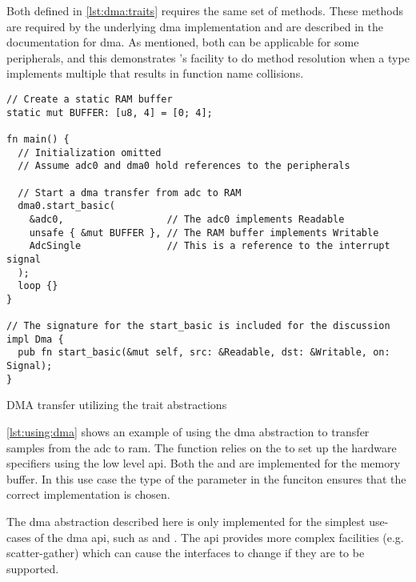 Both  defined in \autoref{lst:dma:traits} requires the same set of methods.
These methods are required by the underlying \gls{dma} implementation and are described in the {\emlib} documentation for \gls{dma}.
As mentioned, both  can be applicable for some peripherals, and this demonstrates {\rust}'s facility to do method resolution when a type implements multiple  that results in function name collisions.

\begin{listing}[H]
  \begin{verbatim}
// Create a static RAM buffer
static mut BUFFER: [u8, 4] = [0; 4];

fn main() {
  // Initialization omitted
  // Assume adc0 and dma0 hold references to the peripherals

  // Start a dma transfer from adc to RAM
  dma0.start_basic(
    &adc0,                  // The adc0 implements Readable
    unsafe { &mut BUFFER }, // The RAM buffer implements Writable
    AdcSingle               // This is a reference to the interrupt signal
  );
  loop {}
}

// The signature for the start_basic is included for the discussion
impl Dma {
  pub fn start_basic(&mut self, src: &Readable, dst: &Writable, on: Signal);
}
  \end{verbatim}
  \caption{DMA transfer utilizing the trait abstractions}
  \label{lst:using:dma}
\end{listing}

\autoref{lst:using:dma} shows an example of using the \gls{dma} abstraction to transfer samples from the \gls{adc} to \gls{ram}.
The  function relies on the  to set up the hardware specifiers using the low level \gls{api}.
Both the  and   are implemented for the memory buffer.
In this use case the type of the  parameter in the  funciton ensures that the correct implementation is chosen.

The \gls{dma} abstraction described here is only implemented for the simplest use-cases of the {\emlib} \gls{dma} \gls{api}, such as  and .
The {\emlib} \gls{api} provides more complex facilities (e.g. scatter-gather) which can cause the interfaces to change if they are to be supported.
